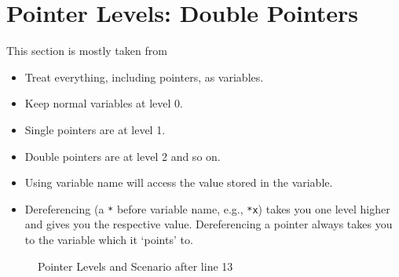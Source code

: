 \documentclass[12pt,a4paper]{article}
\begin{document}
\section{Pointer Levels: Double Pointers}
This section is mostly taken from \cite{Ref:CPP-Double-Pointers}
\begin{itemize}
\item Treat everything, including pointers, as variables.
\item Keep normal variables at level 0.
\item Single pointers are at level 1.
\item Double pointers are at level 2 and so on.
\item Using variable name will access the value stored in the variable.
\item Dereferencing (a \verb|*| before variable name, e.g., \verb|*x|) takes you one level higher and gives you the respective value. Dereferencing a pointer always takes you to the variable which it `points' to.
\end{itemize}
\begin{figure}[H]
\centering
{}
\caption{Pointer Levels and Scenario after line 13}
\label{Pointer-Levels-and-Scenario-after-line-13}
\end{figure}
\end{document}

